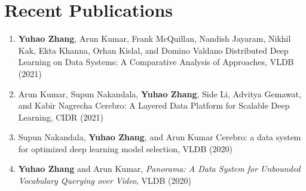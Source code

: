 \documentclass[letterpaper,11pt]{article}
\newcommand{\resumeSubHeadingListStart}{\begin{itemize}[leftmargin=*]}
\newcommand{\resumeSubHeadingListEnd}{\end{itemize}}
\begin{document}
\section{Recent Publications}
\footnotesize
\begin{enumerate}
\item \textbf{Yuhao Zhang}, Arun Kumar, Frank McQuillan, Nandish Jayaram, Nikhil Kak, Ekta Khanna, Orhan Kislal, and Domino Valdano Distributed Deep Learning on Data Systems: A Comparative Analysis of Approaches, VLDB (2021)\\
\item Arun Kumar, Supun Nakandala, \textbf{Yuhao Zhang}, Side Li, Advitya Gemawat, and Kabir Nagrecha Cerebro: A Layered Data Platform for Scalable Deep Learning, CIDR (2021)
\item \textmd{Supun Nakandala}, \textbf{Yuhao Zhang},\textmd{ and Arun Kumar} Cerebro: a data system for optimized deep learning model selection, VLDB (2020)\\
\item \textbf{Yuhao Zhang}\textmd{ and Arun Kumar}, {\slshape Panorama: A Data System for Unbounded Vocabulary Querying over Video}, VLDB (2020)\\
\end{enumerate}
%


\end{document}
